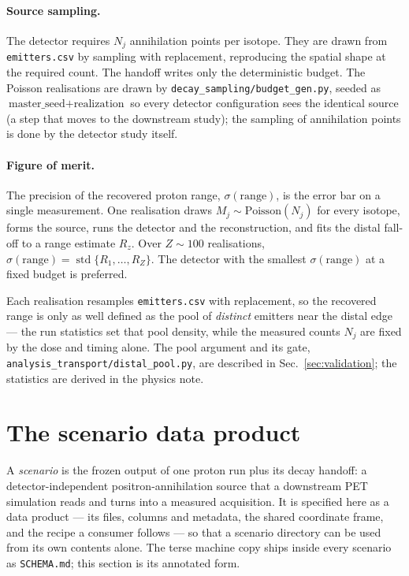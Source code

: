 \documentclass[11pt]{article}
\newcommand{\file}[1]{\texttt{#1}}
\begin{document}
\paragraph{Source sampling.} The detector requires $N_j$ annihilation points per
isotope. They are drawn from \file{emitters.csv} by sampling with replacement,
reproducing the spatial shape at the required count. The handoff writes only the
deterministic budget. The Poisson realisations are drawn by
\file{decay\_sampling/budget\_gen.py}, seeded as
$\text{master\_seed}+\text{realization}$ so every detector configuration sees
the identical source (a step that moves to the downstream study); the sampling
of annihilation points is done by the detector study itself.

\paragraph{Figure of merit.} The precision of the recovered proton range,
$\sigma(\text{range})$, is the error bar on a single measurement. One realisation
draws $M_j\sim\mathrm{Poisson}(N_j)$ for every isotope, forms the source, runs the
detector and the reconstruction, and fits the distal fall-off to a range estimate
$R_z$. Over $Z\sim100$ realisations,
$\sigma(\text{range})=\operatorname{std}\{R_1,\dots,R_Z\}$. The detector with the
smallest $\sigma(\text{range})$ at a fixed budget is preferred.

Each realisation resamples \file{emitters.csv} with replacement, so the
recovered range is only as well defined as the pool of \emph{distinct} emitters
near the distal edge --- the run statistics set that pool density, while the
measured counts $N_j$ are fixed by the dose and timing alone. The pool argument
and its gate, \file{analysis\_transport/distal\_pool.py}, are described in
Sec.~\ref{sec:validation}; the statistics are derived in the physics note.

\section{The scenario data product}
\label{sec:scenario}

A \emph{scenario} is the frozen output of one proton run plus its decay handoff: a
detector-independent positron-annihilation source that a downstream PET simulation
reads and turns into a measured acquisition. It is specified here as a data
product --- its files, columns and metadata, the shared coordinate frame, and the
recipe a consumer follows --- so that a scenario directory can be used from its own
contents alone. The terse machine copy ships inside every scenario as
\file{SCHEMA.md}; this section is its annotated form.
\end{document}
